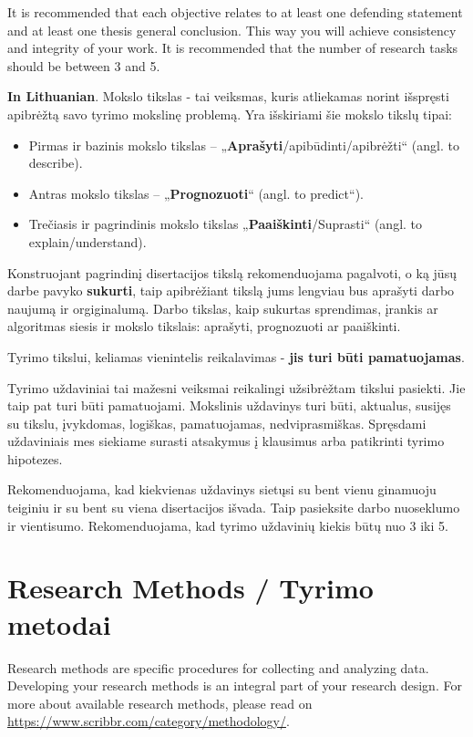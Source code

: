 It is recommended that each objective relates to at least one defending statement and at least one thesis general conclusion. This way you will achieve consistency and integrity of your work. It is recommended that the number of research tasks should be between 3 and 5.

\textbf{In Lithuanian}. 
Mokslo tikslas - tai veiksmas, kuris atliekamas norint išspręsti apibrėžtą savo tyrimo mokslinę problemą. 
Yra išskiriami šie mokslo tikslų tipai:
\begin{itemize}
    \item Pirmas ir bazinis mokslo tikslas – „\textbf{Aprašyti}/apibūdinti/apibrėžti“ (angl. to describe).
    \item Antras mokslo tikslas – „\textbf{Prognozuoti}“ (angl. to predict“).
    \item Trečiasis ir pagrindinis mokslo tikslas „\textbf{Paaiškinti}/Suprasti“ (angl. to explain/understand).
\end{itemize}

Konstruojant pagrindinį disertacijos tikslą rekomenduojama pagalvoti, o ką jūsų darbe pavyko  \textbf{sukurti}, taip apibrėžiant tikslą jums lengviau bus aprašyti darbo naujumą ir orgiginalumą. Darbo tikslas, kaip sukurtas sprendimas, įrankis ar algoritmas siesis ir mokslo tikslais: aprašyti, prognozuoti ar paaiškinti.

Tyrimo tikslui, keliamas vienintelis reikalavimas - \textbf{jis turi būti pamatuojamas}.

Tyrimo uždaviniai tai mažesni veiksmai reikalingi užsibrėžtam tikslui pasiekti. Jie taip pat turi būti  pamatuojami. 
Mokslinis uždavinys turi būti, aktualus, susijęs su tikslu, įvykdomas, logiškas, pamatuojamas, nedviprasmiškas.
Spręsdami uždaviniais mes siekiame surasti atsakymus į klausimus arba patikrinti tyrimo hipotezes.

Rekomenduojama, kad kiekvienas uždavinys sietųsi su bent vienu ginamuoju teiginiu ir su bent su viena disertacijos išvada. Taip pasieksite darbo nuoseklumo ir vientisumo. Rekomenduojama, kad tyrimo uždavinių kiekis būtų nuo  3 iki 5.

\section*{Research Methods / Tyrimo metodai}

Research methods are specific procedures for collecting and analyzing data. Developing your research methods is an integral part of your research design. For more about available research methods, please read on \url{https://www.scribbr.com/category/methodology/}.

